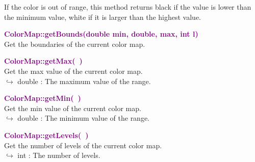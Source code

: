 \begin{tcolorbox}[width=\textwidth,myArgs,tabularx={ll|R}]


\end{tcolorbox}

If the color is out of range, this method returns black if the value is lower than the minimum value, white if it is larger than the highest value.

\textcolor{purple}{\textbf{ColorMap::getBounds(double min, double, max, int l)}}\label{ColorMap::getBounds(double min, double, max, int l)}\\
Get the boundaries of the current color map.

\begin{tcolorbox}[width=\textwidth,myArgs,tabularx={ll|R}]



\end{tcolorbox}


\textcolor{purple}{\textbf{ColorMap::getMax(~)}}\label{ColorMap::getMax()}\\
Get the max value of the current color map.\\ \hspace*{10mm}$\hookrightarrow$ double : The maximum value of the range.


\textcolor{purple}{\textbf{ColorMap::getMin(~)}}\label{ColorMap::getMin()}\\
Get the min value of the current color map.\\ \hspace*{10mm}$\hookrightarrow$ double : The minimum value of the range.


\textcolor{purple}{\textbf{ColorMap::getLevels(~)}}\label{ColorMap::getLevels()}\\
Get the number of levels of the current color map.\\ \hspace*{10mm}$\hookrightarrow$ int : The number of levels.



